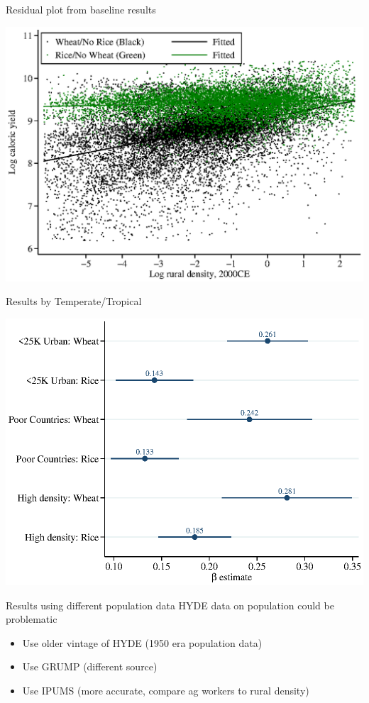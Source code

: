\documentclass[10pt, xcolor=dvipsnames]{beamer}
\begin{document}
\begin{frame}{Residual plot from baseline results}
\begin{center}
\includegraphics[width=.9\textwidth]{fig_beta_crop.eps}
\end{center}
\end{frame}

\begin{frame}{Results by Temperate/Tropical}
\begin{center}
\includegraphics[width=.9\textwidth]{fig_coef_crop_sub_base.eps}
\end{center}
\end{frame}

\begin{frame}{Results using different population data}
HYDE data on population could be problematic

\begin{itemize}
  \item Use older vintage of HYDE (1950 era population data)
  \item Use GRUMP (different source)
  \item Use IPUMS (more accurate, compare ag workers to rural density)
\end{itemize}

\hfill \hyperlink{grump}{}
\end{frame}
\end{document}
